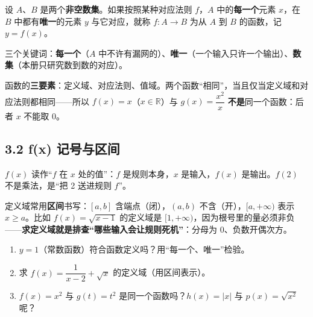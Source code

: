 \documentclass[UTF8,a4paper,11pt]{ctexart}
\begin{document}
\begin{keyconcept}[函数（对应说）]
设 $A$、$B$ 是两个\textbf{非空数集}。如果按照某种对应法则 $f$，$A$ 中的\textbf{每一个}元素 $x$，在 $B$ 中都有\textbf{唯一}的元素 $y$ 与它对应，就称 $f: A \to B$ 为从 $A$ 到 $B$ 的函数，记 $y = f(x)$。

三个关键词：\textbf{每一个}（$A$ 中不许有漏网的）、\textbf{唯一}（一个输入只许一个输出）、\textbf{数集}（本册只研究数到数的对应）。
\end{keyconcept}

\begin{center}
\end{center}

函数的\textbf{三要素}：定义域、对应法则、值域。两个函数“相同”，当且仅当定义域和对应法则都相同——所以 $f(x) = x$（$x \in \mathbb{R}$）与 $g(x) = \dfrac{x^2}{x}$ \textbf{不是}同一个函数：后者 $x$ 不能取 0。

\subsection*{3.2 f(x) 记号与区间}

$f(x)$ 读作“$f$ 在 $x$ 处的值”：$f$ 是规则本身，$x$ 是输入，$f(x)$ 是输出。$f(2)$ 不是乘法，是“把 2 送进规则 $f$”。

定义域常用\textbf{区间}书写：$[a,b]$ 含端点（闭），$(a,b)$ 不含（开），$[a,+\infty)$ 表示 $x \geq a$。比如 $f(x) = \sqrt{x-1}$ 的定义域是 $[1,+\infty)$，因为根号里的量必须非负——\textbf{求定义域就是排查“哪些输入会让规则死机”}：分母为 0、负数开偶次方。

\begin{exercise}[今日自测]
\begin{enumerate}
  \item $y = 1$（常数函数）符合函数定义吗？用“每一个、唯一”检验。
  \item 求 $f(x) = \dfrac{1}{x-2} + \sqrt{x}$ 的定义域（用区间表示）。
  \item $f(x) = x^2$ 与 $g(t) = t^2$ 是同一个函数吗？$h(x) = |x|$ 与 $p(x) = \sqrt{x^2}$ 呢？
\end{enumerate}
\end{exercise}
\end{document}
